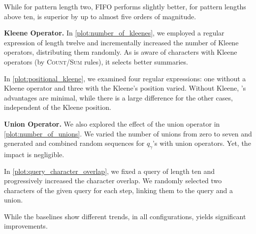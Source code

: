 While for pattern length two, FIFO performs slightly better, for pattern
lengths above ten, \suse{} is superior by up to almost five
orders of magnitude.

\textbf{Kleene Operator.} %
In \autoref{plot:number_of_kleenes}, we employed a regular expression of length twelve and
incrementally increased the number of Kleene operators, distributing them
randomly. As \suse{} is aware of characters with Kleene
operators (by \textsc{Count}/\textsc{Sum} rules), it selects better
summaries.

In \autoref{plot:positional_kleene}, we examined four regular expressions: one
without a Kleene operator and three with the Kleene's position varied.
Without Kleene, \suse{}'s advantages are minimal, while there is a
large difference for the other cases, independent of the Kleene position.

\textbf{Union Operator.} We also
explored the effect of the union operator in
\autoref{plot:number_of_unions}. We varied the number of
unions from zero to seven and generated and combined random sequences for $q_\gamma$'s with union operators. Yet, the impact is negligible.

In \autoref{plot:query_character_overlap}, we fixed a query of length ten and
progressively increased the character overlap. We randomly selected two
characters of the given query for each step, linking them to the query and a
union.

While the baselines show different trends, in all configurations, \suse{}
yields significant improvements.



